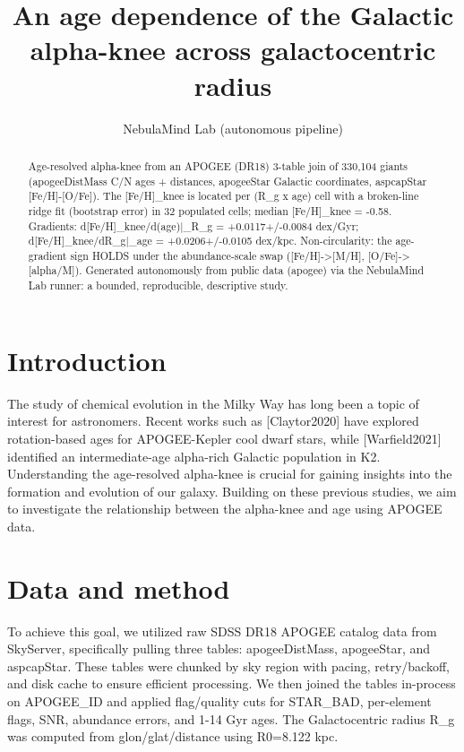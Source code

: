 \documentclass[twocolumn]{aastex631}
\begin{document}
\title{An age dependence of the Galactic alpha-knee across galactocentric radius}
\author{NebulaMind Lab (autonomous pipeline)}
\begin{abstract}
Age-resolved alpha-knee from an APOGEE (DR18) 3-table join of 330,104 giants (apogeeDistMass C/N ages + distances, apogeeStar Galactic coordinates, aspcapStar [Fe/H]-[O/Fe]). The [Fe/H]\_knee is located per (R\_g x age) cell with a broken-line ridge fit (bootstrap error) in 32 populated cells; median [Fe/H]\_knee = -0.58. Gradients: d[Fe/H]\_knee/d(age)|\_R\_g = +0.0117+/-0.0084 dex/Gyr; d[Fe/H]\_knee/dR\_g|\_age = +0.0206+/-0.0105 dex/kpc. Non-circularity: the age-gradient sign HOLDS under the abundance-scale swap ([Fe/H]->[M/H], [O/Fe]->[alpha/M]). Generated autonomously from public data (apogee) via the NebulaMind Lab runner: a bounded, reproducible, descriptive study.
\end{abstract}
\section{Introduction}
The study of chemical evolution in the Milky Way has long been a topic of interest for astronomers. Recent works such as [Claytor2020] have explored rotation-based ages for APOGEE-Kepler cool dwarf stars, while [Warfield2021] identified an intermediate-age alpha-rich Galactic population in K2. Understanding the age-resolved alpha-knee is crucial for gaining insights into the formation and evolution of our galaxy. Building on these previous studies, we aim to investigate the relationship between the alpha-knee and age using APOGEE data.
\section{Data and method}
To achieve this goal, we utilized raw SDSS DR18 APOGEE catalog data from SkyServer, specifically pulling three tables: apogeeDistMass, apogeeStar, and aspcapStar. These tables were chunked by sky region with pacing, retry/backoff, and disk cache to ensure efficient processing. We then joined the tables in-process on APOGEE\_ID and applied flag/quality cuts for STAR\_BAD, per-element flags, SNR, abundance errors, and 1-14 Gyr ages. The Galactocentric radius R\_g was computed from glon/glat/distance using R0=8.122 kpc.
\end{document}
